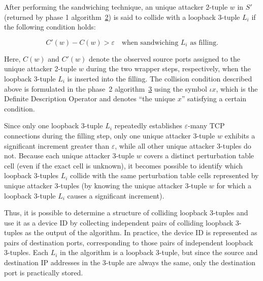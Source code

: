 \documentclass[twocolumn]{report}
\begin{document}
After performing the sandwiching technique, an \alert{unique attacker 2-tuple \(w\)} in $S'$ (returned by phase 1 algorithm~\hyperref[alg:phase1]{2}) is said to collide with a \alert{loopback 3-tuple \(L_i\)} if the following \alert{condition} holds:

\begin{minipage}{\columnwidth}
	\begin{equation*}
		C'(w) - C(w) > \varepsilon
		\quad \text{when sandwiching } L_i \text{ as filling.}
	\end{equation*}
\end{minipage}

Here, \(C(w)\) and \(C'(w)\) denote the observed \alert{source ports assigned to} the \alert{unique attacker 2-tuple \(w\)} during the two wrapper steps, respectively, when the loopback 3-tuple \(L_i\) is inserted into the filling. The collision condition described above is formulated in the phase~2 algorithm~\hyperref[alg:phase2]{3} using the symbol \(\iota x\), which is the \alert{Definite Description Operator} and denotes \enquote{the unique \(x\)} satisfying a certain condition.

Since \alert{only one} loopback 3-tuple \(L_i\) repeatedly establishes \(\varepsilon\)-many TCP connections during the filling step, only one unique attacker 3-tuple \(w\) exhibits a \alert{significant increment} greater than \(\varepsilon\), while all other unique attacker 3-tuples do not. Because each unique attacker 3-tuple \(w\) covers a distinct perturbation table cell (even if the exact cell is unknown), it becomes possible to identify which loopback 3-tuples \(L_i\) collide with the same perturbation table cells represented by unique attacker 3-tuples (by knowing the unique attacker 3-tuple \(w\) for which a loopback 3-tuple \(L_i\) causes a significant increment).

Thus, it is possible to determine a structure of colliding loopback 3-tuples and use it as a device ID by collecting independent pairs of colliding loopback 3-tuples as the \alert{output} of the algorithm. In practice, the device ID is represented as \alert{pairs of destination ports}, corresponding to those pairs of independent loopback 3-tuples. Each $L_i$ in the algorithm is a loopback 3-tuple, but since the source and destination IP addresses in the 3-tuple are always the same, only the destination port is practically stored.
\end{document}

